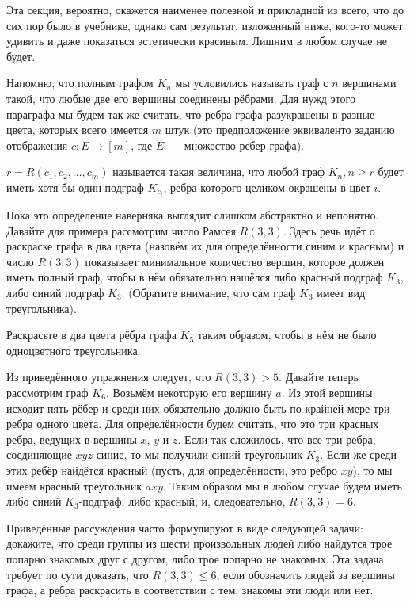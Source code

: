 Эта секция, вероятно, окажется наименее полезной и прикладной из всего, что до сих пор было в учебнике, однако сам результат, изложенный ниже, кого-то может удивить и даже показаться эстетически красивым. Лишним в любом случае не будет.

Напомню, что полным графом $K_n$ мы условились называть граф с $n$ вершинами такой, что любые две его вершины соединены рёбрами. Для нужд этого параграфа мы будем так же считать, что ребра графа разукрашены в разные цвета, которых всего имеется $m$ штук (это предположение эквиваленто заданию отображения $c:E\to[m]$, где $E$~— множество ребер графа).

\begin{definition}
 $r = R(c_1, c_2, \ldots, c_m)$ называется такая величина, что любой граф $K_n, n\ge r$ будет иметь хотя бы один подграф $K_{c_i}$, ребра которого целиком окрашены в цвет $i$.
\end{definition}

Пока это определение наверняка выглядит слишком абстрактно и непонятно. Давайте для примера рассмотрим число Рамсея $R(3, 3)$. Здесь речь идёт о раскраске графа в два цвета (назовём их для определённости синим и красным) и число $R(3, 3)$ показывает минимальное количество вершин, которое должен иметь полный граф, чтобы в нём обязательно нашёлся либо красный подграф $K_3$, либо синий подграф $K_3$. (Обратите внимание, что сам граф $K_3$ имеет вид треугольника).

\begin{exercise}
Раскрасьте в два цвета рёбра графа $K_5$ таким образом, чтобы в нём не было одноцветного треугольника.
\end{exercise}

Из приведённого упражнения следует, что $R(3,3)>5$. Давайте теперь рассмотрим граф $K_6$. Возьмём некоторую его вершину $a$. Из этой вершины исходит пять рёбер и среди них обязательно должно быть по крайней мере три ребра одного цвета. Для определённости будем считать, что это три красных ребра, ведущих в вершины $x$, $y$ и $z$. Если так сложилось, что все три ребра, соединяющие $xyz$ синие, то мы получили синий треугольник $K_3$. Если же среди этих ребёр найдётся красный (пусть, для определённости, это ребро $xy$), то мы имеем красный треугольник $axy$. Таким образом мы в любом случае будем иметь либо синий $K_3$-подграф, либо красный, и, следовательно, $R(3, 3) = 6$.

Приведённые рассуждения часто формулируют в виде следующей задачи: докажите, что среди группы из шести произвольных людей либо найдутся трое попарно знакомых друг с другом, либо трое попарно не знакомых. Эта задача требует по сути доказать, что $R(3, 3) \le 6$, если обозначить людей за вершины графа, а ребра раскрасить в соответствии с тем, знакомы эти люди или нет.

